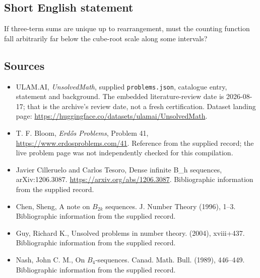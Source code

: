 \documentclass[11pt,a4paper]{article}
\begin{document}
\subsection{Short English statement}

If three-term sums are unique up to rearrangement, must the counting function fall arbitrarily far below the cube-root scale along some intervals?

\subsection{Sources}

{\small

\begin{itemize}

\item[\hypertarget{source:statement:1}{S1}] ULAM.AI, \emph{UnsolvedMath}, supplied \texttt{problems.json}, catalogue entry, statement and background. The embedded literature-review date is 2026-08-17; that is the archive’s review date, not a fresh certification. Dataset landing page: \url{https://huggingface.co/datasets/ulamai/UnsolvedMath}.

\item[\hypertarget{source:statement:2}{S2}] T. F. Bloom, \emph{Erdős Problems}, Problem 41, \url{https://www.erdosproblems.com/41}. Reference from the supplied record; the live problem page was not independently checked for this compilation.

\item[\hypertarget{source:statement:3}{S3}] Javier Cilleruelo and Carlos Tesoro, Dense infinite B\_h sequences, arXiv:1206.3087. \url{https://arxiv.org/abs/1206.3087}. Bibliographic information from the supplied record.

\item[\hypertarget{source:statement:4}{S4}] Chen, Sheng, A note on {$B_{2k}$} sequences. J. Number Theory (1996), 1--3. Bibliographic information from the supplied record.

\item[\hypertarget{source:statement:5}{S5}] Guy, Richard K., Unsolved problems in number theory. (2004), xviii+437. Bibliographic information from the supplied record.

\item[\hypertarget{source:statement:6}{S6}] Nash, John C. M., On {$B_4$}-sequences. Canad. Math. Bull. (1989), 446--449. Bibliographic information from the supplied record.

\end{itemize}

}

\label{end:statement}
\end{document}
